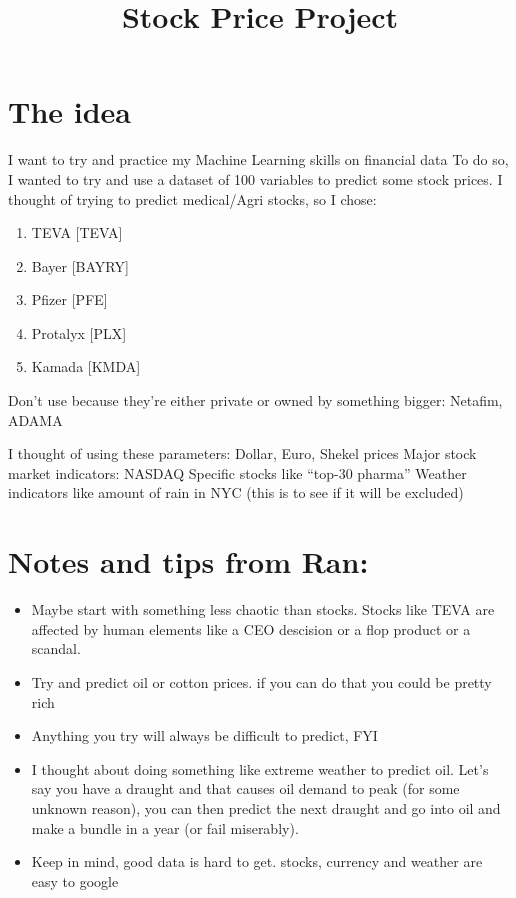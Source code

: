 \documentclass[
]{article}
\title{Stock Price Project}
\author{}
\date{\vspace{-2.5em}}
\providecommand{\tightlist}{%
  \setlength{\itemsep}{0pt}\setlength{\parskip}{0pt}}
\begin{document}
\maketitle

\hypertarget{the-idea}{%
\section{The idea}\label{the-idea}}

I want to try and practice my Machine Learning skills on financial data
To do so, I wanted to try and use a dataset of 100 variables to predict
some stock prices. I thought of trying to predict medical/Agri stocks,
so I chose:

\begin{enumerate}
\def\labelenumi{\arabic{enumi}.}
\tightlist
\item
  TEVA {[}TEVA{]}
\item
  Bayer {[}BAYRY{]}
\item
  Pfizer {[}PFE{]}
\item
  Protalyx {[}PLX{]}
\item
  Kamada {[}KMDA{]}
\end{enumerate}

Don't use because they're either private or owned by something bigger:
Netafim, ADAMA

I thought of using these parameters: Dollar, Euro, Shekel prices Major
stock market indicators: NASDAQ Specific stocks like ``top-30 pharma''
Weather indicators like amount of rain in NYC (this is to see if it will
be excluded)

\hypertarget{notes-and-tips-from-ran}{%
\section{Notes and tips from Ran:}\label{notes-and-tips-from-ran}}

\begin{itemize}
\item
  Maybe start with something less chaotic than stocks. Stocks like TEVA
  are affected by human elements like a CEO descision or a flop product
  or a scandal.
\item
  Try and predict oil or cotton prices. if you can do that you could be
  pretty rich
\item
  Anything you try will always be difficult to predict, FYI
\item
  I thought about doing something like extreme weather to predict oil.
  Let's say you have a draught and that causes oil demand to peak (for
  some unknown reason), you can then predict the next draught and go
  into oil and make a bundle in a year (or fail miserably).
\item
  Keep in mind, good data is hard to get. stocks, currency and weather
  are easy to google
\end{itemize}
\end{document}
